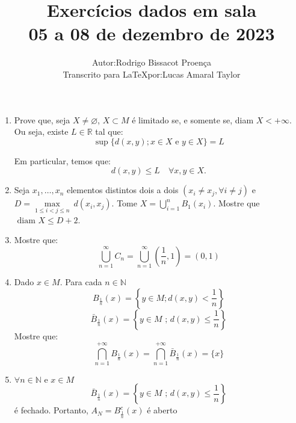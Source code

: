 \documentclass[12pt]{article}
\title{Exercícios dados em sala\\ 05 a 08 de dezembro de 2023}
\author{
    \begin{tabular}{rl}
        Autor: & Rodrigo Bissacot Proença \\
        Transcrito para \LaTeX por: & Lucas Amaral Taylor
    \end{tabular}
}
\begin{document}
\maketitle
\begin{enumerate}
    \item Prove que, seja $X \neq \varnothing$, $X \subset M$ é limitado se, e somente se, diam $X<+\infty$. Ou seja, existe $L \in \mathbb{R}$ tal que:
    \begin{equation*}
        \sup\{d(x, y) ; x \in X \text{ e } y \in X\}=L
    \end{equation*}

    Em particular, temos que:
    \begin{equation*}
    d(x, y) \leqslant L \quad \forall x, y \in X .
    \end{equation*}

    \item Seja $x_1, \ldots, x_n$ elementos distintos dois a dois $\left(x_i \neq x_j, \forall i \neq j\right)$ e $D = \underset{1 \leq i < j \leq n}{\max}\ d(x_i, x_j)$. Tome $X=\bigcup_{i=1}^n B_1\left(x_i\right)$. Mostre que $\text{ diam } X \leq D + 2$.

    \item Mostre que:
    \begin{equation*}
        \bigcup_{n=1}^\infty C_n=\bigcup_{n=1}^\infty \left(\frac{1}{n}, 1\right)=(0,1)
    \end{equation*}

    \item Dado $x \in M$. Para cada $n \in \mathbb{N}$
    \begin{equation*}
        B_{\frac{1}{n}}(x)=\left\{y \in M ; d(x, y)<\frac{1}{n}\right\} 
    \end{equation*}
    \begin{equation*}
        \bar{B}_{\frac{1}{n}}(x)=\left\{y \in M \text{ ; } d(x, y) \leqslant \frac{1}{n}\right\} 
    \end{equation*}
    Mostre que:
    \begin{equation*}
        \bigcap_{n=1}^{+\infty} B_{\frac{1}{n}}(x)=\bigcap_{n=1}^{+\infty} \bar{B}_{\frac{1}{n}}(x)=\{x\}
    \end{equation*}

    \item $\forall n \in \mathbb{N} \text{ e } x \in M$ 
    \begin{equation*}
        \bar{B}_{\frac{1}{n}}(x)=\left\{y \in M \text{ ; } d(x, y) \leq \frac{1}{n}\right\} 
    \end{equation*}
    é fechado. Portanto, $A_N=B_{\frac{1}{n}}^c(x)$ é aberto


\end{enumerate}
\end{document}
